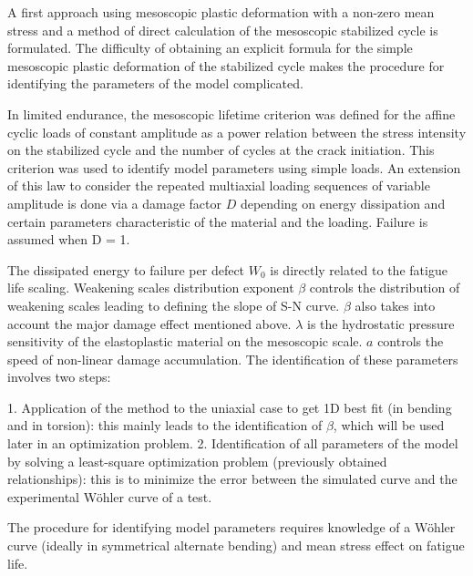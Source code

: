 \documentclass[3p,times,number,review]{elsarticle}
\begin{document}
A first approach using mesoscopic plastic deformation with a non-zero mean stress and a method of direct calculation of the mesoscopic stabilized cycle is formulated. The difficulty of obtaining an explicit formula for the simple mesoscopic plastic deformation of the stabilized cycle makes the procedure for identifying the parameters of the model complicated. 

In limited endurance, the mesoscopic lifetime criterion was defined for the affine cyclic loads of constant amplitude as a power relation between the stress intensity on the stabilized cycle and the number of cycles at the crack initiation. This criterion was used to identify model parameters using simple loads. An extension of this law to consider the repeated multiaxial loading sequences of variable amplitude is done via a damage factor $D$ depending on energy dissipation and certain parameters characteristic of the material and the loading. Failure is assumed when D = 1.


The dissipated energy to failure per defect  $W_0$ is directly related to the fatigue life scaling. Weakening scales distribution exponent  $\beta$ controls the distribution of weakening scales leading to defining the slope of S-N curve. $\beta$ also takes into account the major damage effect mentioned above.  $\lambda$ is the hydrostatic pressure sensitivity of the elastoplastic material on the mesoscopic scale.  $a$ controls the speed of non-linear damage accumulation. The identification of these parameters involves two steps:

1. Application of the method to the uniaxial case to get 1D best fit (in bending and in torsion): this mainly leads to the identification of $\beta$, which will be used later in an optimization problem.
2. Identification of all parameters of the model by solving a least-square optimization problem (previously obtained relationships): this is to minimize the error between the simulated curve and the experimental Wöhler curve of a test.

The procedure for identifying model parameters requires knowledge of a Wöhler curve (ideally in symmetrical alternate bending) and mean stress effect on fatigue life.
\end{document}
